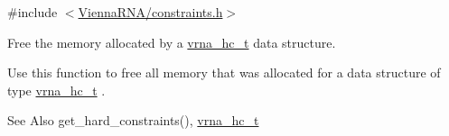 {\ttfamily \#include $<$\hyperlink{constraints_8h}{Vienna\-R\-N\-A/constraints.\-h}$>$}



Free the memory allocated by a \hyperlink{group__constraints_gac7e4c4f8abe3163a68110c5bff24e01d}{vrna\-\_\-hc\-\_\-t} data structure. 

Use this function to free all memory that was allocated for a data structure of type \hyperlink{group__constraints_gac7e4c4f8abe3163a68110c5bff24e01d}{vrna\-\_\-hc\-\_\-t} .

\begin{DoxySeeAlso}{See Also}
get\-\_\-hard\-\_\-constraints(), \hyperlink{group__constraints_gac7e4c4f8abe3163a68110c5bff24e01d}{vrna\-\_\-hc\-\_\-t} 
\end{DoxySeeAlso}
